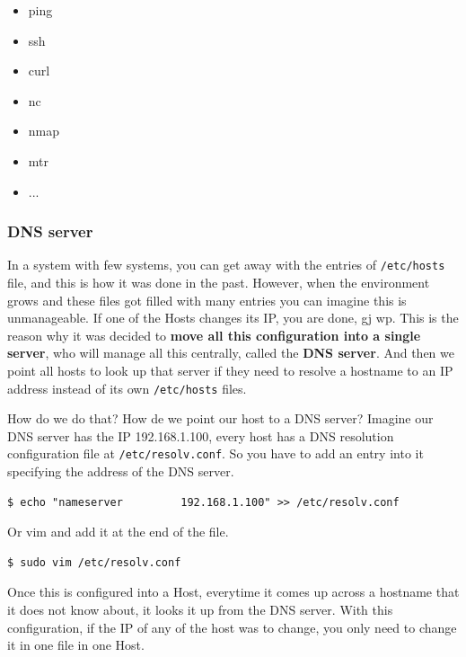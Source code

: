 \documentclass{article}
\newenvironment{codetemplate}[1][]{%
  \mybasecolorbox[#1]
  \itshape
}{%
  \endmybasecolorbox
}
\begin{document}
\begin{itemize}
    \item ping
    \item ssh
    \item curl
    \item nc
    \item nmap
    \item mtr
    \item ...
\end{itemize}

\subsubsection{DNS server}

In a system with few systems, you can get away with the entries of \verb|/etc/hosts| file, and this is how it was done in the past. However, when the environment grows and these files got filled with many entries you can imagine this is unmanageable. If one of the Hosts changes its IP, you are done, gj wp. This is the reason why it was decided to \textbf{move all this configuration into a single server}, who will manage all this centrally, called the \textbf{DNS server}. And then we point all hosts to look up that server if they need to resolve a hostname to an IP address instead of its own \verb|/etc/hosts| files.

How do we do that? How de we point our host to a DNS server? Imagine our DNS server has the IP 192.168.1.100, every host has a DNS resolution configuration file at \verb|/etc/resolv.conf|. So you have to add an entry into it specifying the address of the DNS server.

\begin{codetemplate}{}
\begin{verbatim}
$ echo "nameserver         192.168.1.100" >> /etc/resolv.conf
\end{verbatim}
\end{codetemplate}

Or vim and add it at the end of the file.
\begin{codetemplate}{}
\begin{verbatim}
$ sudo vim /etc/resolv.conf
\end{verbatim}
\end{codetemplate}

Once this is configured into a Host, everytime it comes up across a hostname that it does not know about, it looks it up from the DNS server. With this configuration, if the IP of any of the host was to change, you only need to change it in one file in one Host.
\end{document}
